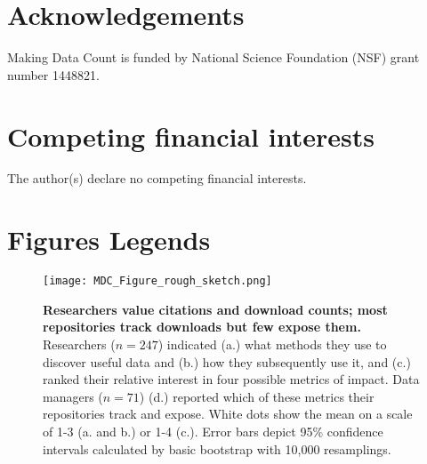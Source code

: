 \documentclass[english]{article}
\begin{document}
\section*{Acknowledgements}

Making Data Count is funded by National Science Foundation (NSF) grant number 1448821.


\section*{Competing financial interests}


The author(s) declare no competing financial interests.


\section*{Figures Legends}



\begin{figure}[!ht]
\begin{center}
\texttt{[image: MDC\_Figure\_rough\_sketch.png]}
\end{center}
\caption{
{\bf Researchers value citations and download counts; most repositories track downloads but few expose them.}
Researchers ($n=247$) indicated (a.) what methods they use to discover useful data and (b.) how they subsequently use it, and (c.) ranked their relative interest in four possible metrics of impact.
Data managers ($n=71$) (d.) reported which of these metrics their repositories track and expose.
White dots show the mean on a scale of 1-3 (a. and b.) or 1-4 (c.).
Error bars depict 95\% confidence intervals calculated by basic bootstrap with 10,000 resamplings. 
}
\label{fig:results}
\end{figure}
\end{document}
